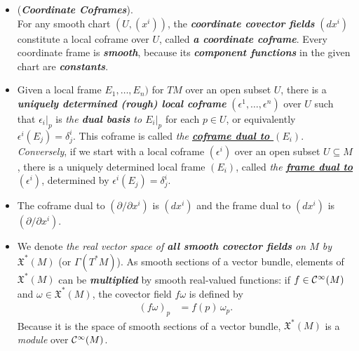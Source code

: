 \documentclass[11pt]{article}
\begin{document}
\begin{itemize}
\item \begin{example} (\emph{\textbf{Coordinate Coframes}}). \\
For any smooth chart $(U, (x^i))$, the \emph{\textbf{coordinate covector fields}} $(dx^i)$ constitute a local coframe over $U$, called \emph{\textbf{a coordinate coframe}}. Every coordinate frame is \emph{\textbf{smooth}}, because its \emph{\textbf{component functions}} in the given chart are \emph{\textbf{constants}}.
\end{example}

\item \begin{definition}
Given a local frame $E_1,\ldots,E_n)$ for $TM$ over an open subset $U$, there is a \emph{\textbf{uniquely determined (rough) local coframe}} $(\epsilon^1, \ldots, \epsilon^n)$ over $U$ such that $\epsilon_i|_{p}$ is \emph{the \textbf{dual basis} to $E_i|_{p}$} for each $p \in U$, or equivalently $\epsilon^i(E_{j}) = \delta_{j}^{i}$. This coframe
is called \emph{the \underline{\textbf{coframe dual to $(E_i)$}}}. \emph{Conversely}, if we start with a local coframe $(\epsilon^{i})$ over an open subset $U \subseteq M$, there is a uniquely determined local frame $(E_i)$, called \emph{the \underline{\textbf{frame dual to  $(\epsilon^{i})$}}}, determined by $\epsilon^i(E_{j}) = \delta_{j}^{i}$. 
\end{definition}

\item \begin{remark}
The coframe dual to $(\partial / \partial x^i)$ is $(dx^{i})$ and the frame dual to $(dx^{i})$ is $(\partial / \partial x^i)$.
\end{remark}


\item \begin{remark}
We denote \emph{the real vector space of \textbf{all smooth covector fields} on $M$ by $\mathfrak{X}^{*}(M)$} (or $\Gamma(T^{*}M)$). As smooth sections of a vector bundle, elements of $\mathfrak{X}^{*}(M)$ can be \emph{\textbf{multiplied}} by smooth real-valued functions: if $f \in {\mathcal C}^{\infty}(M)$ and $\omega \in \mathfrak{X}^{*}(M)$, the covector field $f\omega$ is defined by
\begin{align}
(f\omega)_p &= f(p)\,\omega_{p}. \label{eqn: function_multiply_covector}
\end{align} Because it is the space of smooth sections of a vector bundle, $\mathfrak{X}^{*}(M)$ is a \emph{module} over  ${\mathcal C}^{\infty}(M)$.
\end{remark}


\end{itemize}
\end{document}
